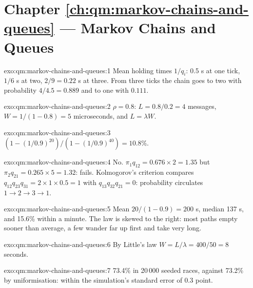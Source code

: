 \section*{Chapter \ref{ch:qm:markov-chains-and-queues} --- Markov Chains and Queues}

\begin{solution}{exo:qm:markov-chains-and-queues:1}
Mean holding times $1/q_i$: 0.5 s at one tick, $1/6$ s at two, $2/9 = 0.22$ s at three. From three ticks the chain goes to
two with probability $4/4.5 = 0.889$ and to one with $0.111$.
\end{solution}

\begin{solution}{exo:qm:markov-chains-and-queues:2}
$\rho = 0.8$: $L = 0.8/0.2 = 4$ messages, $W = 1/(1 - 0.8) = 5$ microseconds, and $L = \lambda W$.
\end{solution}

\begin{solution}{exo:qm:markov-chains-and-queues:3}
$(1 - (1/0.9)^{20})/(1 - (1/0.9)^{40}) = 10.8\%$.
\end{solution}

\begin{solution}{exo:qm:markov-chains-and-queues:4}
No. $\pi_1q_{12} = 0.676 \times 2 = 1.35$ but $\pi_2q_{21} = 0.265 \times 5 = 1.32$:  fails. Kolmogorov's criterion
compares $q_{12}q_{23}q_{31} = 2 \times 1 \times 0.5 = 1$ with $q_{13}q_{32}q_{21} = 0$: probability circulates $1 \to 2 \to 3 \to 1$.
\end{solution}

\begin{solution}{exo:qm:markov-chains-and-queues:5}
Mean $20/(1 - 0.9) = 200$ s, median 137 s, and 15.6\% within a minute. The law is skewed to the right: most paths
empty sooner than average, a few wander far up first and take very long.
\end{solution}

\begin{solution}{exo:qm:markov-chains-and-queues:6}
By Little's law $W = L/\lambda = 400/50 = 8$ seconds.
\end{solution}

\begin{solution}{exo:qm:markov-chains-and-queues:7}
73.4\% in 20\,000 seeded races, against 73.2\% by uniformisation: within the simulation's standard error of 0.3
point.
\end{solution}

